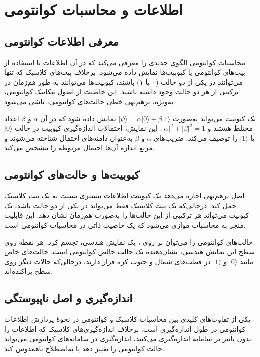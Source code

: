 \section{اطلاعات و محاسبات کوانتومی}
\subsection{معرفی اطلاعات کوانتومی}
محاسبات کوانتومی الگوی جدیدی را معرفی می‌کند که در آن اطلاعات با استفاده از بیت‌های کوانتومی یا کیوبیت‌ها نمایش داده می‌شود. برخلاف بیت‌های کلاسیک که تنها می‌توانند در یکی از دو حالت (۰ یا ۱) باشند، کیوبیت‌ها می‌توانند به طور هم‌زمان در ترکیبی از هر دو حالت وجود داشته باشند. این خاصیت از اصول مکانیک کوانتومی، به‌ویژه، برهم‌نهی خطی حالت‌های کوانتومی، ناشی می‌شود.

یک کیوبیت می‌تواند به‌صورت $|\psi\rangle = \alpha|0\rangle + \beta|1\rangle$ نمایش داده شود که در آن $\alpha$ و $\beta$ اعداد مختلط هستند و $|\alpha|^2 + |\beta|^2 = 1$. این نمایش، احتمالات اندازه‌گیری کیوبیت در حالت $|0\rangle$ یا $|1\rangle$ را توصیف می‌کند. ضریب‌های $\alpha$ و $\beta$ به‌عنوان دامنه‌های احتمال شناخته می‌شوند و مربع اندازه آن‌ها احتمال مربوطه را مشخص می‌کند.

\subsection{کیوبیت‌ها و حالت‌های کوانتومی}
اصل برهم‌نهی اجازه می‌دهد یک کیوبیت اطلاعات بیشتری نسبت به یک بیت کلاسیک حمل کند. درحالی‌که یک بیت کلاسیک فقط می‌تواند در یکی از دو حالت باشد، یک کیوبیت می‌تواند هر ترکیبی از این حالت‌ها را به‌صورت هم‌زمان نشان دهد. این قابلیت منجر به محاسبات موازی می‌شود که یک خاصیت ذاتی در محاسبات کوانتومی است.

حالت‌های کوانتومی را می‌توان بر روی 
،
یک نمایش هندسی، تجسم کرد. هر نقطه روی سطح این نمایش هندسی، نشان‌دهندهٔ یک حالت خالص کوانتومی است. حالت‌های خاص مانند $|0\rangle$ و $|1\rangle$ در قطب‌های شمال و جنوب کره قرار دارند، درحالی‌که حالات دیگر روی سطح پراکنده‌اند.

\subsection{اندازه‌گیری و اصل ناپیوستگی}
یکی از تفاوت‌های کلیدی بین محاسبات کلاسیک و کوانتومی در نحوهٔ پردازش اطلاعات کوانتومی در طول اندازه‌گیری است. برخلاف اندازه‌گیری‌های کلاسیک که اطلاعات را بدون تأثیر بر سامانه اندازه‌گیری می‌کنند، اندازه‌گیری در سامانه‌های کوانتومی می‌تواند حالت کوانتومی را تغییر دهد یا به‌اصطلاح ناهمدوس کند.

